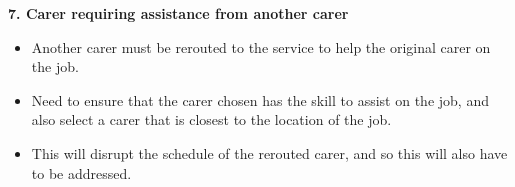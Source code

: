 \documentclass[a4paper]{article}
\begin{document}
\noindent \textbf{7. Carer requiring assistance from another carer}
\begin{itemize}[label=\textcolor{myPink}{\textbullet},leftmargin=*, itemsep=-0.1em]
	\item Another carer must be rerouted to the service to help the original carer on the job. 
	\item Need to ensure that the carer chosen has the skill to assist on the job, and also select a carer that is closest to the location of the job.
	\item This will disrupt the schedule of the rerouted carer, and so this will also have to be addressed.
\end{itemize}
\end{document}
